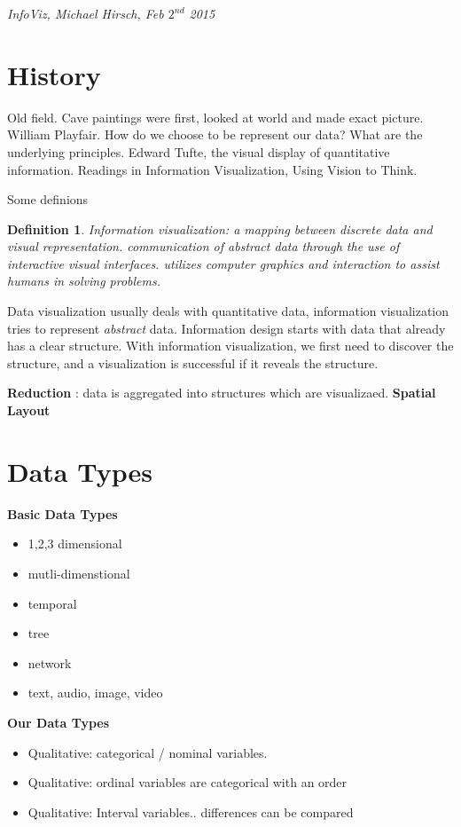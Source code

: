 \documentclass[]{article}
\newtheorem{mydef}{Definition}[section]
\begin{document}
\begin{flushright}
	\textit{InfoViz, Michael Hirsch, Feb $2^{nd}$ 2015}
\end{flushright}

\section{History}
Old field. Cave paintings were first, looked at world and made exact picture. William Playfair. How do we choose to be represent our data? What are the underlying principles. Edward Tufte, the visual display of quantitative information. Readings in Information Visualization, Using Vision to Think.

Some definions

\begin{mydef}
Information visualization: a mapping between discrete data and visual representation. communication of abstract data through the use of interactive visual interfaces. utilizes computer graphics and interaction to assist humans in solving problems.
\end{mydef}

Data visualization usually deals with quantitative data, information visualization tries to represent \textit{abstract} data. Information design starts with data that already has a clear structure. With information visualization, we first need to discover the structure, and a visualization is successful if it reveals the structure. 

\textbf{Reduction} : data is aggregated into structures which are visualizaed.
\textbf{Spatial Layout}

\section{Data Types}

\textbf{Basic Data Types}
\begin{itemize}
\setlength\itemsep{0em}
	\item 1,2,3 dimensional
	\item mutli-dimenstional
	\item temporal
	\item tree
	\item network
	\item text, audio, image, video
\end{itemize}

\textbf{Our Data Types}
\begin{itemize}
\setlength\itemsep{0em}
	\item Qualitative: categorical / nominal variables. 
	\item Qualitative: ordinal variables are categorical with an order
	\item Qualitative: Interval variables.. differences can be compared
\end{itemize}
\end{document}
